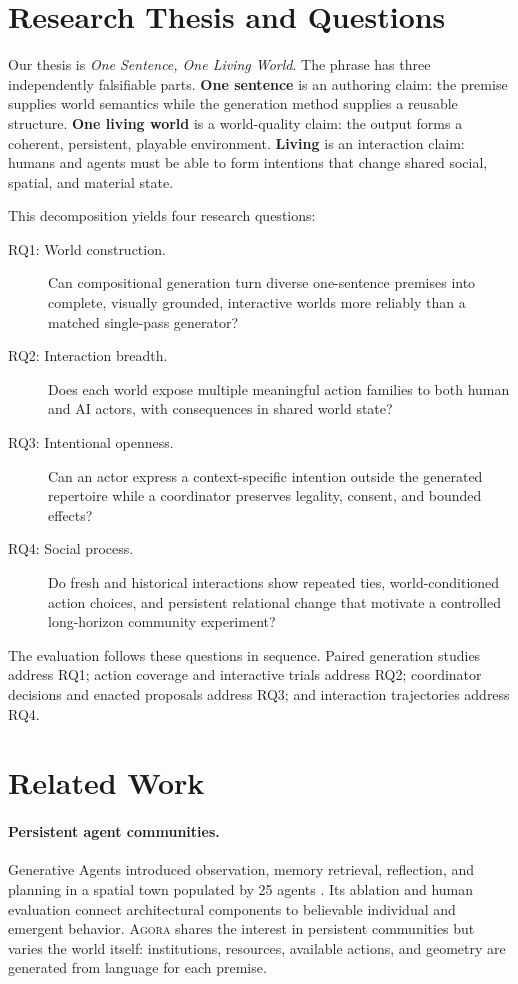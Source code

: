 \documentclass[10pt,twocolumn]{article}
\newcommand{\agora}{\textsc{Agora}\xspace}
\newcommand{\systemvision}{\emph{One Sentence, One Living World}}
\begin{document}
\section{Research Thesis and Questions}

Our thesis is \systemvision. The phrase has three independently falsifiable
parts. \textbf{One sentence} is an authoring claim: the premise supplies world
semantics while the generation method supplies a reusable structure.
\textbf{One living world} is a world-quality claim: the output forms a coherent,
persistent, playable environment. \textbf{Living} is an interaction claim:
humans and agents must be
able to form intentions that change shared social, spatial, and material state.

This decomposition yields four research questions:
\begin{description}
  \item[RQ1: World construction.] Can compositional generation turn diverse
  one-sentence premises into complete, visually grounded, interactive worlds
  more reliably than a matched single-pass generator?
  \item[RQ2: Interaction breadth.] Does each world expose multiple meaningful
  action families to both human and AI actors, with consequences in shared
  world state?
  \item[RQ3: Intentional openness.] Can an actor express a context-specific
  intention outside the generated repertoire while a coordinator preserves
  legality, consent, and bounded effects?
  \item[RQ4: Social process.] Do fresh and historical interactions show repeated
  ties, world-conditioned action choices, and persistent relational change that
  motivate a controlled long-horizon community experiment?
\end{description}

The evaluation follows these questions in sequence. Paired generation studies
address RQ1; action coverage and interactive trials address RQ2;
coordinator decisions and enacted proposals address RQ3; and interaction
trajectories address RQ4.

\section{Related Work}

\paragraph{Persistent agent communities.}
Generative Agents introduced observation, memory retrieval, reflection, and
planning in a spatial town populated by 25 agents \cite{park2023}. Its
ablation and human evaluation connect architectural components to believable
individual and emergent behavior. \agora shares the interest in persistent
communities but varies the world itself: institutions, resources, available
actions, and geometry are generated from language for each premise.
\end{document}

